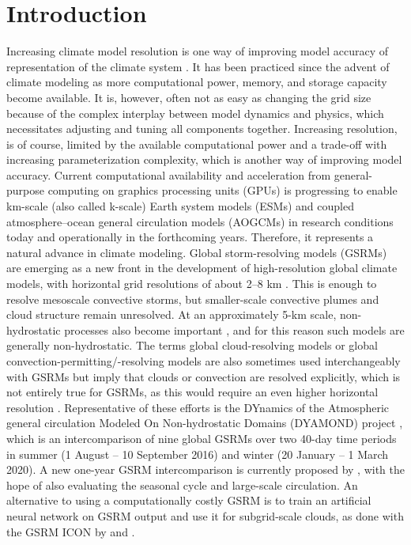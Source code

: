 \documentclass[draft]{agujournal2019}
\begin{document}
\section{Introduction}
\label{sec:introduction}

Increasing climate model resolution is one way of improving model accuracy of representation of the climate system . It has been practiced since the advent of climate modeling as more computational power, memory, and storage capacity become available. It is, however, often not as easy as changing the grid size because of the complex interplay between model dynamics and physics, which necessitates adjusting and tuning all components together. Increasing resolution, is of course, limited by the available computational power and a trade-off with increasing parameterization complexity, which is another way of improving model accuracy. Current computational availability and acceleration from general-purpose computing on graphics processing units (GPUs) is progressing to enable km-scale (also called k-scale) Earth system models (ESMs) and coupled atmosphere--ocean general circulation models (AOGCMs) in research conditions today and operationally in the forthcoming years. Therefore, it represents a natural advance in climate modeling. Global storm-resolving models (GSRMs) are emerging as a new front in the development of high-resolution global climate models, with horizontal grid resolutions of about 2--8 km . This is enough to resolve mesoscale convective storms, but smaller-scale convective plumes and cloud structure remain unresolved. At an approximately 5-km scale, non-hydrostatic processes also become important , and for this reason such models are generally non-hydrostatic. The terms global cloud-resolving models or global convection-permitting/-resolving models are also sometimes used interchangeably with GSRMs but imply that clouds or convection are resolved explicitly, which is not entirely true for GSRMs, as this would require an even higher horizontal resolution . Representative of these efforts is the DYnamics of the Atmospheric general circulation Modeled On Non-hydrostatic Domains (DYAMOND) project , which is an intercomparison of nine global GSRMs over two 40-day time periods in summer (1 August -- 10 September 2016) and winter (20 January -- 1 March 2020). A new one-year GSRM intercomparison is currently proposed by , with the hope of also evaluating the seasonal cycle and large-scale circulation. An alternative to using a computationally costly GSRM is to train an artificial neural network on GSRM output and use it for subgrid-scale clouds, as done with the GSRM ICON by  and .
\end{document}
